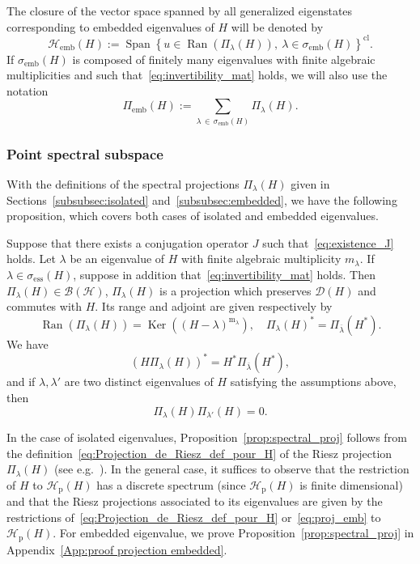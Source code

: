 \documentclass[10pt]{amsart}
\theoremstyle{definition}\newtheorem{defi}[theo]{Definition}\newtheorem{rema}[theo]{Remark}\newtheorem{exam}[theo]{Example}\newtheorem{exem}[theo]{Example}\newtheorem{nota}[theo]{Notation}
\newcommand{\Hi}{\mathcal{H}}
\newcommand{\ess}{\mathrm{ess}}
\newcommand{\rmp}{\mathrm{p}}
\newcommand{\rmm}{\mathrm{m}}
\newcommand{\clB}{\mathcal{B}}
\newcommand{\clD}{\mathcal{D}}
\DeclareMathOperator{\Ran}{Ran}
\DeclareMathOperator{\Ker}{Ker}
\DeclareMathOperator{\Span}{Span}
\begin{document}
The closure of the vector space spanned by all generalized eigenstates corresponding to embedded eigenvalues of $H$ will be denoted by
\begin{equation*}
\Hi_{\mathrm{emb}}(H):=\Span\left\lbrace u\in\Ran(\Pi_\lambda(H)),~\lambda\in\sigma_\mathrm{emb}(H)\right\rbrace^{\mathrm{cl}}.
\end{equation*}
If $\sigma_{\mathrm{emb}}(H)$ is composed of finitely many eigenvalues with finite algebraic multiplicities and such that~\eqref{eq:invertibility_mat} holds, we will also use the notation
\begin{equation*}
\Pi_{\mathrm{emb}}(H):=\sum_{\lambda\,\in\,\sigma_{\mathrm{emb}}(H)}\Pi_\lambda(H).
\end{equation*}

\subsubsection{Point spectral subspace}
With the definitions of the spectral projections $\Pi_\lambda(H)$ given in Sections~\ref{subsubsec:isolated} and~\ref{subsubsec:embedded}, we have the following proposition, which covers both cases of isolated and embedded eigenvalues.

\begin{prop}\label{prop:spectral_proj}
Suppose that there exists a conjugation operator $J$ such that~\eqref{eq:existence_J} holds. Let $\lambda$ be an eigenvalue of $H$ with finite algebraic multiplicity $m_\lambda$. If $\lambda\in\sigma_{\ess}(H)$, suppose in addition that~\eqref{eq:invertibility_mat} holds. Then $\Pi_\lambda(H)\in\clB(\Hi)$, $\Pi_\lambda(H)$ is a projection which preserves $\clD(H)$ and commutes with $H$. Its range and adjoint are given respectively by
\begin{equation*}
\Ran(\Pi_\lambda(H)) = \Ker((H-\lambda)^{\rmm_\lambda}), \quad \Pi_{\lambda}(H)^*=\Pi_{\overline{\lambda}}(H^*).
\end{equation*}
We have
\begin{equation*}
\left(H\Pi_\lambda(H)\right)^*=H^*\Pi_{\overline{\lambda}}(H^*),
\end{equation*}
and if $\lambda,\lambda'$ are two distinct eigenvalues of $H$ satisfying the assumptions above, then
\begin{equation*}
\Pi_\lambda(H)\Pi_{\lambda'}(H)=0.
\end{equation*}
\end{prop}

In the case of isolated eigenvalues, Proposition~\ref{prop:spectral_proj} follows from the definition~\eqref{eq:Projection_de_Riesz_def_pour_H} of the Riesz projection $\Pi_\lambda(H)$ (see e.g.~\cite[Theorem~XII.5]{ReSi80_01}). In the general case, it suffices to observe that the restriction of $H$ to $\Hi_{\rmp}(H)$ has a discrete spectrum (since $\Hi_{\rmp}(H)$ is finite dimensional) and that the Riesz projections associated to its eigenvalues are given by the restrictions of~\eqref{eq:Projection_de_Riesz_def_pour_H} or~\eqref{eq:proj_emb} to $\Hi_{\rmp}(H)$. For embedded eigenvalue, we prove Proposition~\ref{prop:spectral_proj} in Appendix~\ref{App:proof projection embedded}.
\end{document}
